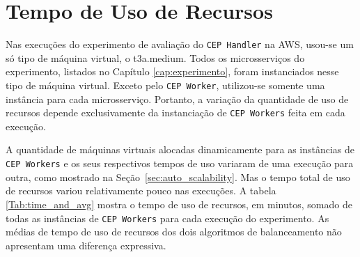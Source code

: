 \newpage
\section{Tempo de Uso de Recursos}
\label{sec:resource_usage_time}



Nas execuções do experimento de avaliação do \texttt{CEP Handler} na AWS, usou-se um só tipo de máquina virtual, o t3a.medium. Todos os microsserviços do experimento, listados no Capítulo \ref{cap:experimento}, foram instanciados nesse tipo de máquina virtual. Exceto pelo \texttt{CEP Worker}, utilizou-se somente uma instância para cada microsserviço. Portanto, a variação da quantidade de uso de recursos depende exclusivamente da instanciação de \texttt{CEP Workers} feita em cada execução.

A quantidade de máquinas virtuais alocadas dinamicamente para as instâncias de \texttt{CEP Workers} e os seus respectivos tempos de uso variaram de uma execução para outra, como mostrado na Seção~\ref{sec:auto_scalability}.
Mas o tempo total de uso de recursos variou relativamente pouco nas execuções.
A tabela \ref{Tab:time_and_avg} mostra o tempo de uso de recursos, em minutos, somado de todas as instâncias de \texttt{CEP Workers} para cada execução do experimento. As médias de tempo de uso de recursos dos dois algoritmos de balanceamento não apresentam uma diferença expressiva.


